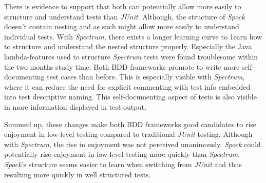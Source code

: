 There is evidence to support that both can potentially allow more easily to structure and understand tests than \textit{JUnit}. Although, the structure of
\textit{Spock} doesn't contain nesting and as such might allow more easily to understand individual tests.
With \textit{Spectrum}, there exists a longer learning curve to 1earn how to structure and understand the nested structure
properly. Especially the Java lambda-features used to structure \textit{Spectrum} tests were found troublesome within the two months
study time.
Both BDD frameworks
promote to write more self-documenting test cases than before. This is especially visible with \textit{Spectrum}, where it
can reduce the need for explicit commenting with test info embedded into test descriptive naming. This self-documenting
aspect of tests is also visible in more information displayed in test output.

Summed up, these changes make both BDD frameworks good candidates to rise enjoyment in low-level testing compared to traditional
\textit{JUnit} testing. Although with \textit{Spectrum}, the rise in enjoyment was not perceived unanimously. \textit{Spock} could potentially rise enjoyment in low-level
testing more quickly than \textit{Spectrum}.
\textit{Spock}'s structure seems easier to learn when switching from \textit{JUnit} and thus resulting more quickly in well structured tests.
